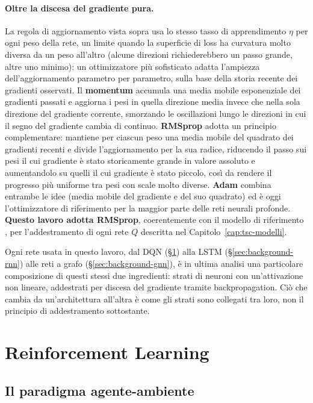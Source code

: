 \paragraph{Oltre la discesa del gradiente pura.} La regola di
aggiornamento vista sopra usa lo stesso tasso di apprendimento $\eta$ per
ogni peso della rete, un limite quando la superficie di loss ha curvatura
molto diversa da un peso all'altro (alcune direzioni richiederebbero un
passo grande, altre uno minimo): un ottimizzatore più sofisticato adatta
l'ampiezza dell'aggiornamento parametro per parametro, sulla base della
storia recente dei gradienti osservati. Il \textbf{momentum} accumula una
media mobile esponenziale dei gradienti passati e aggiorna i pesi in quella
direzione media invece che nella sola direzione del gradiente corrente,
smorzando le oscillazioni lungo le direzioni in cui il segno del gradiente
cambia di continuo. \textbf{RMSprop} \citep{tieleman2012rmsprop} adotta un
principio complementare: mantiene per ciascun peso una media mobile del
quadrato dei gradienti recenti e divide l'aggiornamento per la sua radice,
riducendo il passo sui pesi il cui gradiente è stato storicamente grande in
valore assoluto e aumentandolo su quelli il cui gradiente è stato piccolo,
così da rendere il progresso più uniforme tra pesi con scale molto diverse.
\textbf{Adam} \citep{kingma2015adam} combina entrambe le idee (media mobile
del gradiente e del suo quadrato) ed è oggi l'ottimizzatore di riferimento
per la maggior parte delle reti neurali profonde. \textbf{Questo lavoro
adotta RMSprop}, coerentemente con il modello di riferimento
\citep{wang2022metastgat}, per l'addestramento di ogni rete $Q$ descritta
nel Capitolo~\ref{cap:tsc-modelli}.

Ogni rete usata in questo lavoro, dal DQN (§\ref{sec:background-rl}) alla
LSTM (§\ref{sec:background-rnn}) alle reti a grafo
(§\ref{sec:background-gnn}), è in ultima analisi una particolare
composizione di questi stessi due ingredienti: strati di neuroni con
un'attivazione non lineare, addestrati per discesa del gradiente tramite
backpropagation. Ciò che cambia da un'architettura all'altra è come gli
strati sono collegati tra loro, non il principio di addestramento
sottostante.

\section{Reinforcement Learning}
\label{sec:background-rl}

\subsection{Il paradigma agente-ambiente}

